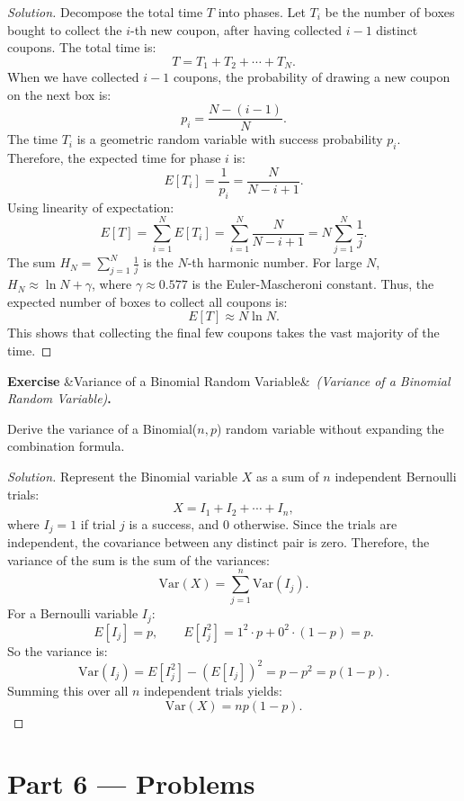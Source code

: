 \documentclass[12pt, a4paper]{article}
\newcounter{exercise}
\newenvironment{exercise}[1][]{%
  \refstepcounter{exercise}%
  \par\vspace{6pt}%
  \noindent\textbf{\color{Gold}Exercise \theexercise}%
  \ifx&#1&\else\ \textit{(#1)}\fi\textbf{.}\enskip
}{\par\vspace{4pt}}
\begin{document}
\begin{proof}[Solution]
Decompose the total time $T$ into phases. Let $T_i$ be the number of boxes bought to collect the $i$-th new coupon, after having collected $i-1$ distinct coupons. The total time is:
\[
  T = T_1 + T_2 + \cdots + T_N.
\]
When we have collected $i-1$ coupons, the probability of drawing a new coupon on the next box is:
\[
  p_i = \frac{N - (i-1)}{N}.
\]
The time $T_i$ is a geometric random variable with success probability $p_i$. Therefore, the expected time for phase $i$ is:
\[
  E[T_i] = \frac{1}{p_i} = \frac{N}{N - i + 1}.
\]
Using linearity of expectation:
\[
  E[T] = \sum_{i=1}^N E[T_i] = \sum_{i=1}^N \frac{N}{N - i + 1} = N \sum_{j=1}^N \frac{1}{j}.
\]
The sum $H_N = \sum_{j=1}^N \frac{1}{j}$ is the $N$-th harmonic number. For large $N$, $H_N \approx \ln N + \gamma$, where $\gamma \approx 0.577$ is the Euler-Mascheroni constant. Thus, the expected number of boxes to collect all coupons is:
\[
  E[T] \approx N \ln N.
\]
This shows that collecting the final few coupons takes the vast majority of the time.
\end{proof}

\begin{exercise}[Variance of a Binomial Random Variable]
Derive the variance of a Binomial($n, p$) random variable without expanding the combination formula.
\end{exercise}

\begin{proof}[Solution]
Represent the Binomial variable $X$ as a sum of $n$ independent Bernoulli trials:
\[
  X = I_1 + I_2 + \cdots + I_n,
\]
where $I_j = 1$ if trial $j$ is a success, and $0$ otherwise.
Since the trials are independent, the covariance between any distinct pair is zero. Therefore, the variance of the sum is the sum of the variances:
\[
  \text{Var}(X) = \sum_{j=1}^n \text{Var}(I_j).
\]
For a Bernoulli variable $I_j$:
\[
  E[I_j] = p, \qquad E[I_j^2] = 1^2 \cdot p + 0^2 \cdot (1-p) = p.
\]
So the variance is:
\[
  \text{Var}(I_j) = E[I_j^2] - (E[I_j])^2 = p - p^2 = p(1-p).
\]
Summing this over all $n$ independent trials yields:
\[
  \text{Var}(X) = np(1-p).
\]
\end{proof}

\newpage

\section{Part 6 \texorpdfstring{---}{--} Problems}
\end{document}
